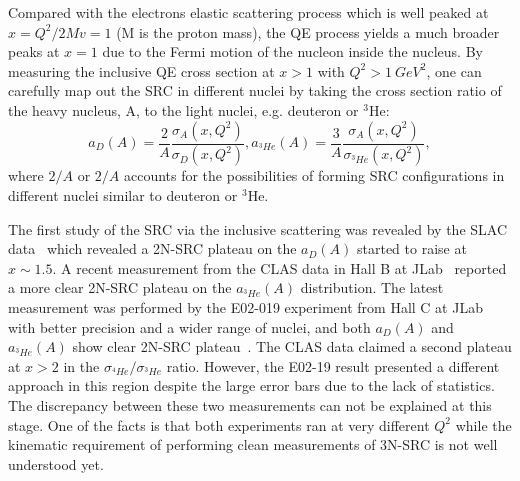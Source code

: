 	Compared with the electrons elastic scattering process which is well peaked at $x=Q^{2}/2Mv=1$ (M is the proton mass), the QE process yields a much broader peaks at $x=1$ due to the Fermi motion of the nucleon inside the nucleus. By measuring the inclusive QE cross section at $x>1$ with $Q^{2}>1~GeV^{2}$, one can carefully map out the SRC in different nuclei by taking the cross section ratio of the heavy nucleus, A, to the light nuclei, e.g. deuteron or $\mathrm{^{3}He}$:
	\begin{equation}
	a_{D}(A) = \frac{2}{A}\frac{\sigma_{A}(x,Q^{2})}{\sigma_{D}(x,Q^{2})},  a_{^{3}He}(A) = \frac{3}{A}\frac{\sigma_{A}(x,Q^{2})}{\sigma_{^{3}He}(x,Q^{2})},
	\end{equation}
	where $2/A$ or $2/A$ accounts for the possibilities of forming SRC configurations in different nuclei similar to deuteron or $\mathrm{^{3}He}$. 

	The first study of the SRC via the inclusive scattering was revealed by the SLAC data~\cite{SLAC_Measurement_PRC.48.2451} which revealed a 2N-SRC plateau on the $a_{D}(A)$ started to raise at $x\sim1.5$. A recent measurement from the CLAS data in Hall B at JLab~\cite{PhysRevLett.96.082501} reported a more clear 2N-SRC plateau on the $a_{^{3}He}(A)$ distribution. The latest measurement was performed by the E02-019 experiment from Hall C at JLab with better precision and a wider range of nuclei, and both $a_{D}(A)$ and $a_{^{3}He}(A)$ show clear 2N-SRC plateau~\cite{PhysRevLett.105.212502}. The CLAS data claimed a second plateau at $x>2$ in the $\sigma_{^{4}He}/\sigma_{^{3}He}$ ratio. However, the E02-19 result presented a different approach in this region despite the large error bars due to the lack of statistics. The discrepancy between these two measurements can not be explained at this stage. One of the facts is that both experiments ran at very different $Q^{2}$ while the kinematic requirement of performing clean measurements of 3N-SRC is not well understood yet.


